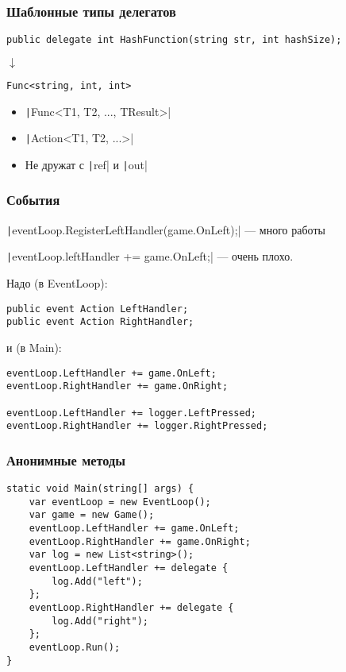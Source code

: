 \documentclass[xetex,mathserif,serif]{beamer}
\begin{document}
	\begin{frame}[fragile]
		\frametitle{Шаблонные типы делегатов}
		\begin{verbatim}
public delegate int HashFunction(string str, int hashSize);
		\end{verbatim}
		\hspace{2cm}\begin{Large}$\downarrow$\end{Large}
		\begin{verbatim}
Func<string, int, int>
		\end{verbatim}
		\begin{itemize}
			\item \texttt|Func<T1, T2, ..., TResult>|
			\item \texttt|Action<T1, T2, ...>|
			\item Не дружат с \texttt|ref| и \texttt|out|
		\end{itemize}
	\end{frame}

	\begin{frame}[fragile]
		\frametitle{События}
		\texttt|eventLoop.RegisterLeftHandler(game.OnLeft);| --- много работы

		\texttt|eventLoop.leftHandler += game.OnLeft;| --- очень плохо. 

		\vspace{3mm}
		Надо (в EventLoop):
		\begin{verbatim}
public event Action LeftHandler;
public event Action RightHandler;
		\end{verbatim}
		\vspace{3mm}
		и (в Main):
		\begin{verbatim}
eventLoop.LeftHandler += game.OnLeft;
eventLoop.RightHandler += game.OnRight;

eventLoop.LeftHandler += logger.LeftPressed;
eventLoop.RightHandler += logger.RightPressed;
		\end{verbatim}
	\end{frame}

	\begin{frame}[fragile]
		\frametitle{Анонимные методы}
		\begin{verbatim}
static void Main(string[] args) {
    var eventLoop = new EventLoop();
    var game = new Game();
    eventLoop.LeftHandler += game.OnLeft;
    eventLoop.RightHandler += game.OnRight;
    var log = new List<string>();
    eventLoop.LeftHandler += delegate {
        log.Add("left");
    };
    eventLoop.RightHandler += delegate {
        log.Add("right");
    };
    eventLoop.Run();
}
		\end{verbatim}
	\end{frame}
\end{document}
